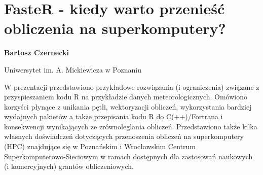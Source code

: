 \documentclass[\main/boa.tex]{subfiles}
\begin{document}
\section{FasteR - kiedy warto przenieść obliczenia na superkomputery?}

\begin{minipage}{0.915\textwidth}
	\centering
  {\bf {} Bartosz Czernecki}
\end{minipage}



\begin{affiliations}
\begin{minipage}{0.915\textwidth}
\centering
Uniwersytet im. A. Mickiewicza w Poznaniu  \\[-2pt]
\end{minipage}
\end{affiliations}

\vskip 0.3cm

W prezentacji przedstawiono przykładowe rozwiązania (i ograniczenia) związane z przyspieszaniem kodu R na przykładzie danych meteorologicznych. Omówiono korzyści płynące z unikania pętli, wektoryzacji obliczeń, wykorzystania bardziej wydajnych pakietów a także przepisania kodu R do C(++)/Fortrana i konsekwencji wynikających ze zrównoleglania obliczeń. 
Przedstawiono także kilka własnych doświadczeń dotyczących przenoszenia obliczeń na superkomputery (HPC) znajdujące się w Poznańskim i Wrocławskim Centrum Superkomputerowo-Sieciowym w ramach dostępnych dla zastosowań naukowych (i komercyjnych) grantów obliczeniowych.
\end{document}
